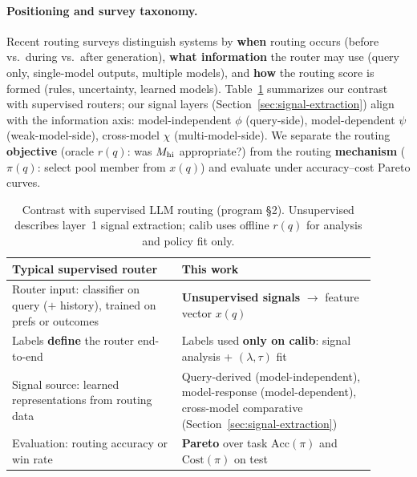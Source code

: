 \paragraph{Positioning and survey taxonomy.}
Recent routing surveys distinguish systems by \textbf{when} routing occurs (before vs.\ during vs.\ after generation), \textbf{what information} the router may use (query only, single-model outputs, multiple models), and \textbf{how} the routing score is formed (rules, uncertainty, learned models).
Table~\ref{tab:contrast} summarizes our contrast with supervised routers; our signal layers (Section~\ref{sec:signal-extraction}) align with the information axis: model-independent $\phi$ (query-side), model-dependent $\psi$ (weak-model-side), cross-model $\chi$ (multi-model-side).
We separate the routing \textbf{objective} (oracle $r(q)$: was $M_{\mathrm{hi}}$ appropriate?) from the routing \textbf{mechanism} ($\pi(q)$: select pool member from $x(q)$) and evaluate under accuracy--cost Pareto curves.

\begin{table}[t]
  \centering
  \small
  \begin{tabular}{@{}p{0.42\linewidth}p{0.48\linewidth}@{}}
    \toprule
    \textbf{Typical supervised router} & \textbf{This work} \\
    \midrule
    Router input: classifier on query ($+$ history), trained on prefs or outcomes &
    \textbf{Unsupervised signals} $\rightarrow$ feature vector $x(q)$ \\
    Labels \textbf{define} the router end-to-end &
    Labels used \textbf{only on calib}: signal analysis + $(\lambda,\tau)$ fit \\
    Signal source: learned representations from routing data &
    Query-derived (model-independent), model-response (model-dependent), cross-model comparative (Section~\ref{sec:signal-extraction}) \\
    Evaluation: routing accuracy or win rate &
    \textbf{Pareto} over task $\mathrm{Acc}(\pi)$ and $\mathrm{Cost}(\pi)$ on test \\
    \bottomrule
  \end{tabular}
  \caption{Contrast with supervised LLM routing (program §2). Unsupervised describes layer~1 signal extraction; calib uses offline $r(q)$ for analysis and policy fit only.}
  \label{tab:contrast}
\end{table}
